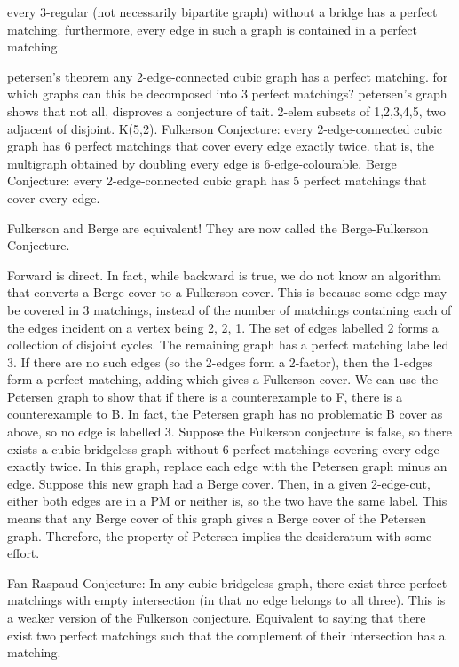 every 3-regular (not necessarily bipartite graph) without a bridge has a perfect matching. furthermore, every edge in such a graph is contained in a perfect matching.

petersen's theorem
any 2-edge-connected cubic graph has a perfect matching.
for which graphs can this be decomposed into 3 perfect matchings? petersen's graph shows that not all, disproves a conjecture of tait. 2-elem subsets of {1,2,3,4,5}, two adjacent of disjoint. K(5,2).
Fulkerson Conjecture: every 2-edge-connected cubic graph has 6 perfect matchings that cover every edge exactly twice. that is, the multigraph obtained by doubling every edge is 6-edge-colourable.
Berge Conjecture: every 2-edge-connected cubic graph has 5 perfect matchings that cover every edge.

Fulkerson and Berge are equivalent! They are now called the Berge-Fulkerson Conjecture.

Forward is direct.
In fact, while backward is true, we do not know an algorithm that converts a Berge cover to a Fulkerson cover. This is because some edge may be covered in 3 matchings, instead of the number of matchings containing each of the edges incident on a vertex being 2, 2, 1. The set of edges labelled 2 forms a collection of disjoint cycles. The remaining graph has a perfect matching labelled 3. If there are no such edges (so the 2-edges form a 2-factor), then the 1-edges form a perfect matching, adding which gives a Fulkerson cover.
We can use the Petersen graph to show that if there is a counterexample to F, there is a counterexample to B. In fact, the Petersen graph has no problematic B cover as above, so no edge is labelled 3.
Suppose the Fulkerson conjecture is false, so there exists a cubic bridgeless graph without 6 perfect matchings covering every edge exactly twice. In this graph, replace each edge with the Petersen graph minus an edge. Suppose this new graph had a Berge cover. Then, in a given 2-edge-cut, either both edges are in a PM or neither is, so the two have the same label. This means that any Berge cover of this graph gives a Berge cover of the Petersen graph. Therefore, the property of Petersen implies the desideratum with some effort.

Fan-Raspaud Conjecture: In any cubic bridgeless graph, there exist three perfect matchings with empty intersection (in that no edge belongs to all three).
This is a weaker version of the Fulkerson conjecture. 
Equivalent to saying that there exist two perfect matchings such that the complement of their intersection has a matching.

